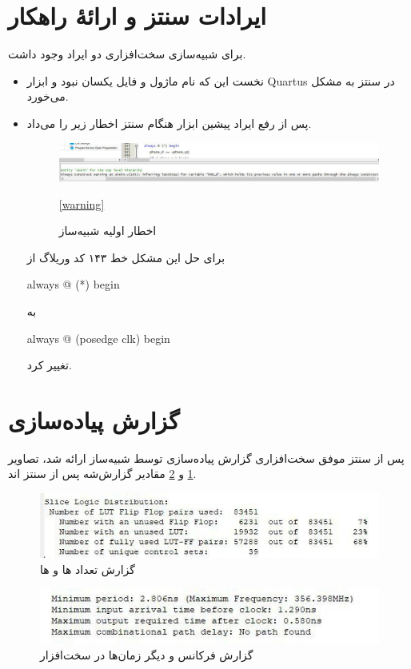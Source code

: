 \section{ایرادات سنتز و ارائهٔ راهکار}
برای شبیه‌سازی سخت‌افزاری دو ایراد وجود داشت.
\begin{itemize}
\item 
نخست این که نام ماژول و فایل یکسان نبود و ابزار 
Quartus 
در سنتز به مشکل می‌خورد.
\item 
پس از رفع ایراد پیشین ابزار هنگام سنتز اخطار زیر را می‌داد.
\begin{figure}[H]
\includegraphics[width = \textwidth]{figs/synthesize/warning.jpg}
\caption{اخطار اولیه شبیه‌ساز}
\ref{warning}
\end{figure}
 برای حل این مشکل خط ۱۴۳ کد وریلاگ از 
 \begin{code}
 	always @ (*) begin
 \end{code}
 به 
 \begin{code}
 	always @ (posedge clk) begin
 \end{code}
 تغییر کرد. 
\end{itemize}

\section{گزارش پیاده‌سازی}
پس از سنتز موفق سخت‌افزاری گزارش پیاده‌سازی توسط شبیه‌ساز ارائه شد، تصاویر 
\ref{statistic_1}
و 
\ref{statistic_2}
مقادیر گزارش‌شه پس از سنتز اند.

\begin{figure}[H]
\includegraphics[scale=1]{figs/synthesize/flip_flop_pairs.jpg}
\caption{گزارش تعداد  ها و  ها}
\label{statistic_1}
\end{figure}

\begin{figure}[H]
\includegraphics[scale=1]{figs/synthesize/statistics.jpg}
\caption{گزارش فرکانس و دیگر زمان‌ها در سخت‌افزار}
\label{statistic_2}
\end{figure}

